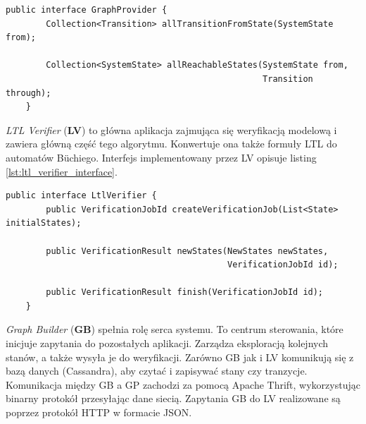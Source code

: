 \begin{lstlisting}[caption={Interfejs implementowany przez GP.},captionpos=b,label={lst:graph_provider_interface}]
    public interface GraphProvider {
        Collection<Transition> allTransitionFromState(SystemState from);

        Collection<SystemState> allReachableStates(SystemState from,
                                                   Transition through);
    }
\end{lstlisting}

\textit{LTL Verifier} (\textbf{LV}) to główna aplikacja zajmująca się weryfikacją modelową i zawiera główną część tego algorytmu.
Konwertuje ona także formuły LTL do automatów Büchiego.
Interfejs implementowany przez LV opisuje listing \ref{lst:ltl_verifier_interface}.

\begin{lstlisting}[caption={Interfejs implementowany przez LV.},captionpos=b,label={lst:ltl_verifier_interface}]
    public interface LtlVerifier {
        public VerificationJobId createVerificationJob(List<State> initialStates);

        public VerificationResult newStates(NewStates newStates,
                                            VerificationJobId id);

        public VerificationResult finish(VerificationJobId id);
    }
\end{lstlisting}

\textit{Graph Builder} (\textbf{GB}) spełnia rolę serca systemu.
To centrum sterowania, które inicjuje zapytania do pozostałych aplikacji.
Zarządza eksploracją kolejnych stanów, a także wysyła je do weryfikacji.
Zarówno GB jak i LV komunikują się z bazą danych (Cassandra), aby czytać i zapisywać stany czy tranzycje.
Komunikacja między GB a GP zachodzi za pomocą Apache Thrift, wykorzystując binarny protokół przesyłając dane siecią.
Zapytania GB do LV realizowane są poprzez protokół HTTP w formacie JSON.


